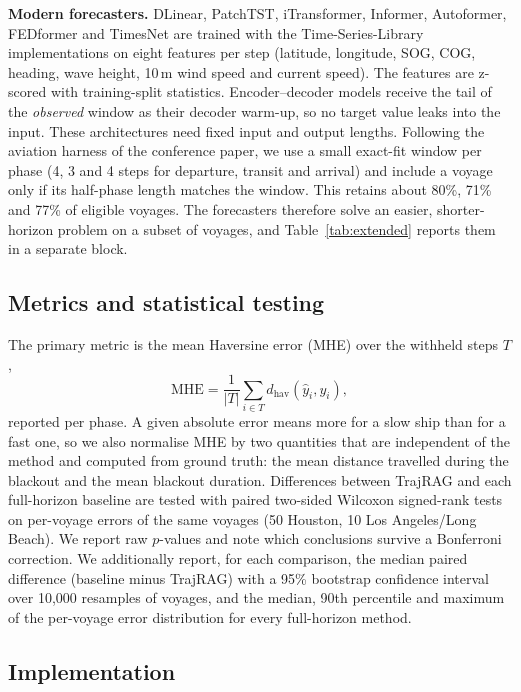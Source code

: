 \textbf{Modern forecasters.} DLinear, PatchTST, iTransformer, Informer,
Autoformer, FEDformer and TimesNet are trained with the Time-Series-Library
implementations \citep{wu2023tslib} on eight features per step (latitude,
longitude, SOG, COG, heading, wave height, 10\,m wind speed and current
speed). The features are z-scored with training-split statistics.
Encoder--decoder models receive the tail of the \emph{observed} window as
their decoder warm-up, so no target value leaks into the input. These
architectures need fixed input and output lengths. Following the aviation
harness of the conference paper, we use a small exact-fit window per phase
(4, 3 and 4 steps for departure, transit and arrival) and include a voyage
only if its half-phase length matches the window. This retains about 80\%,
71\% and 77\% of eligible voyages. The forecasters therefore solve an
easier, shorter-horizon problem on a subset of voyages, and
Table~\ref{tab:extended} reports them in a separate block.

\subsection{Metrics and statistical testing}
\label{sec:metrics}

The primary metric is the mean Haversine error (MHE) \citep{zhao2024space}
over the withheld steps $T$,
\begin{equation}
\mathrm{MHE} = \frac{1}{|T|} \sum_{i \in T} d_{\mathrm{hav}}(\hat{y}_i, y_i),
\label{eq:mhe}
\end{equation}
reported per phase. A given absolute error means more for a slow ship than
for a fast one, so we also normalise MHE by two quantities that are
independent of the method and computed from ground truth: the mean distance
travelled during the blackout and the mean blackout duration. Differences
between TrajRAG and each full-horizon baseline are tested with paired
two-sided Wilcoxon signed-rank tests \citep{wilcoxon1945individual} on
per-voyage errors of the same voyages (50 Houston, 10 Los Angeles/Long
Beach). We report raw $p$-values and note
which conclusions survive a Bonferroni correction. We additionally report,
for each comparison, the median paired difference (baseline minus TrajRAG)
with a 95\% bootstrap confidence interval over 10,000 resamples of voyages,
and the median, 90th percentile and maximum of the per-voyage error
distribution for every full-horizon method.

\subsection{Implementation}
\label{sec:implementation}

